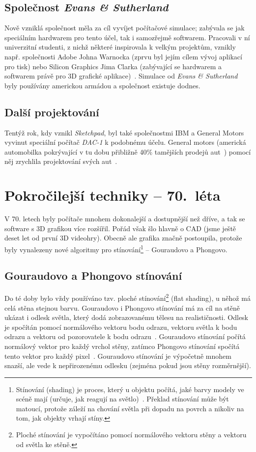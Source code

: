 \documentclass[a4paper, 11pt]{report}
\begin{document}
\begin{chapterwithoutpagebreak}
\section{Společnost \emph{Evans \& Sutherland}}
Nově vzniklá společnost měla za cíl vyvíjet počítačové simulace; zabývala se jak speciálním hardwarem pro tento účel, tak i samozřejmě softwarem. Pracovali v ní univerzitní studenti, z nichž některé inspirovala k velkým projektům, vznikly např. společnosti Adobe Johna Warnocka (zprvu byl jejím cílem vývoj aplikací pro tisk) nebo Silicon Graphics Jima Clarka (zabývající se hardwarem a softwarem právě pro 3D grafické aplikace)~\cite{es:birth-of-cgi}. Simulace od \emph{Evans \& Sutherland} byly používány americkou armádou a společnost existuje dodnes.

\section{Další projektování}
Tentýž rok, kdy vznikl \emph{Sketchpad}, byl také společnostmi IBM a General Motors vyvinut speciální počítač \emph{DAC-1} k podobnému účelu. General motors (americká automobilka pokrývající v tu dobu přibližně 40\% tamějších prodejů aut~\cite{britannica:gm}) pomocí něj zrychlila projektování svých aut~\cite{ufo:history}.

\chapter{Pokročilejší techniky -- 70.~léta}
V 70. letech byly počítače mnohem dokonalejší a dostupnější než dříve, a tak se software s 3D grafikou více rozšířil. Pořád však šlo hlavně o CAD (jsme ještě deset let od první 3D videohry). Obecně ale grafika značně postoupila, protože byly vynalezeny nové algoritmy pro stínování\footnote{Stínování (shading) je proces, který u objektu počítá, jaké barvy modely ve scéně mají (určuje, jak reagují na světlo)~\cite{scratchapixel:shading}. Překlad stínování může být matoucí, protože záleží na chování světla při dopadu na povrch a nikoliv na tom, jak objekty vrhají stíny.} -- Gouraudovo a Phongovo. 

\section{Gouraudovo a Phongovo stínování}
Do té doby bylo vždy používáno tzv. ploché stínování\footnote{Ploché stínování je vypočítáno pomocí normálového vektoru stěny a vektoru od světla ke stěně.} (flat shading), u něhož má celá stěna stejnou barvu. Gouraudovo i Phongovo stínování má za cíl na stěně ukázat i odlesk světla, který dodá zobrazovanému tělesu na realističnosti. Odlesk je spočítán pomocí normálového vektoru bodu odrazu, vektoru světla k bodu odrazu a vektoru od pozorovatele k bodu odrazu~\cite{javatpoint:gouraud}. Gouraudovo stínování počítá normálový vektor pro každý vrchol stěny, zatímco Phongovo stínování spočítá tento vektor pro každý pixel~\cite{javatpoint:phong}. Gouraudovo stínování je výpočetně mnohem snazší, ale vede k nepřirozenému odlesku (zejména pokud jsou stěny rozměrnější).


\end{chapterwithoutpagebreak}
\end{document}

